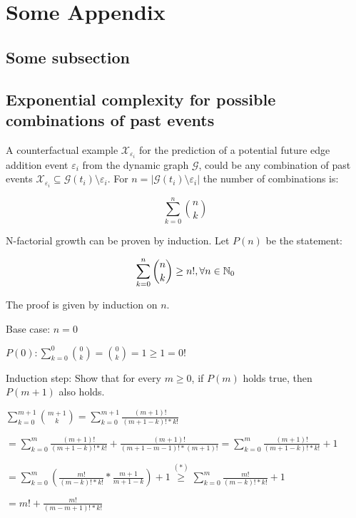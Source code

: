 \section{Some Appendix}
\subsection{Some subsection}



\subsection{Exponential complexity for possible combinations of past events}
\label{s_Appendix_NFactorialComplexity}

A counterfactual example $\mathcal{X}_{\varepsilon_i}$ for the prediction of a potential future edge addition event $\varepsilon_i$ from the dynamic graph $\mathcal{G}$, could be any combination of past events $\mathcal{X}_{\varepsilon_i} \subseteq \mathcal{G}(t_i) \setminus \varepsilon_i$. For $n = |\mathcal{G}(t_i) \setminus \varepsilon_i|$ the number of combinations is:

\begin{equation}
    \sum_{k=0}^n \binom{n}{k}
\end{equation}



N-factorial growth can be proven by induction. Let $P(n)$ be the statement:

\begin{equation}
    \sum_{k=0}^n \binom{n}{k} \geq n!, \vspace{10pt} \forall n \in \mathbb{N}_0
\end{equation}

The proof is given by induction on $n$.

Base case: $n = 0$

\begin{center}
    $P(0): \sum_{k=0}^0 \binom{0}{k} = \binom{0}{k} = 1 \geq 1 = 0!$
\end{center}

Induction step: Show that for every $m \geq 0$, if $P(m)$ holds true, then $P(m+1)$ also holds.

\begin{center}
    $\sum_{k=0}^{m + 1} \binom{m + 1}{k} = \sum_{k=0}^{m + 1} \frac{(m+1)!}{(m+1-k)! * k!}$

    $= \sum_{k=0}^{m} \frac{(m+1)!}{(m+1-k)! * k!} + \frac{(m+1)!}{(m+1-m-1)! * (m+1)!} = \sum_{k=0}^{m} \frac{(m+1)!}{(m+1-k)! * k!} + 1$

    $= \sum_{k=0}^{m} (\frac{m!}{(m-k)! * k!} * \frac{m + 1}{m + 1 - k}) + 1 \stackrel{(*)}{\geq} \sum_{k=0}^{m} \frac{m!}{(m-k)! * k!} + 1$

    $= m! + \frac{m!}{(m-m + 1)! * k!}$
\end{center}
